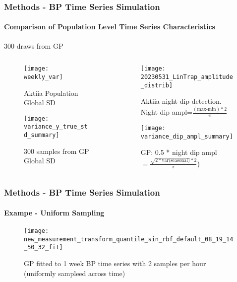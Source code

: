 \documentclass[
	8pt, %
]{beamer}
\begin{document}
\begin{frame}
	\frametitle{Methods - BP Time Series Simulation}
	\framesubtitle{Comparison of Population Level Time Series Characteristics}
	300 draws from GP

			\begin{columns}[c] %
		\begin{column}{0.45\textwidth} %
				\begin{figure}
					\texttt{[image: weekly\_var]}
					\caption{Aktiia Population Global SD}

				\end{figure}

			\begin{figure}
					\texttt{[image: variance\_y\_true\_std\_summary]}
					\caption{300 samples from GP Global SD}
			\end{figure}
		\end{column}
		\begin{column}{0.5\textwidth} %
				\begin{figure}
					\texttt{[image: 20230531\_LinTrap\_amplitude\_distrib]}
					\caption{Aktiia night dip detection. Night dip ampl=$\frac{(\text{max-min})*2}{\pi}$}
				\end{figure}

			\begin{figure}
					\texttt{[image: variance\_dip\_ampl\_summary]}
					\caption{GP: 0.5 * night dip ampl $=\frac{\sqrt {2* \text{var(seasonal)}} * 2}{\pi}$)}
			\end{figure}


		\end{column}
	\end{columns}

\end{frame}

\begin{frame}
	\frametitle{Methods - BP Time Series Simulation}
	\framesubtitle{Exampe - Uniform Sampling}


	\begin{figure}
			\texttt{[image: new\_measurement\_transform\_quantile\_sin\_rbf\_default\_08\_19\_14\_50\_32\_fit]}
			\caption{GP fitted to 1 week BP time series with 2 samples per hour (uniformly sampleed across time)}
	\end{figure}

\end{frame}
\end{document}
